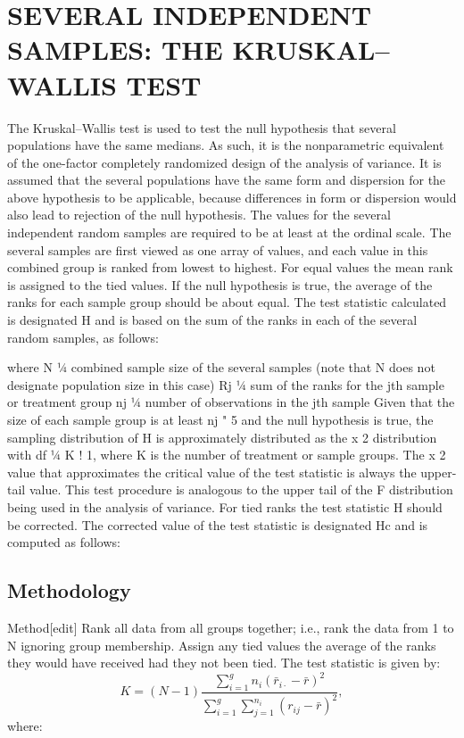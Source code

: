 
\section{SEVERAL INDEPENDENT SAMPLES: THE KRUSKAL–WALLIS TEST}

The Kruskal–Wallis test is used to test the null hypothesis that several populations have the same
medians. As such, it is the nonparametric equivalent of the one-factor completely randomized design of the
analysis of variance. It is assumed that the several populations have the same form and dispersion for the
above hypothesis to be applicable, because differences in form or dispersion would also lead to rejection of
the null hypothesis. The values for the several independent random samples are required to be at least at the
ordinal scale.
The several samples are first viewed as one array of values, and each value in this combined group is
ranked from lowest to highest. For equal values the mean rank is assigned to the tied values. If the null
hypothesis is true, the average of the ranks for each sample group should be about equal. The test statistic
calculated is designated H and is based on the sum of the ranks in each of the several random samples, as
follows:

where N ¼ combined sample size of the several samples
(note that N does not designate population size in this case)
Rj ¼ sum of the ranks for the jth sample or treatment group
nj ¼ number of observations in the jth sample
Given that the size of each sample group is at least nj " 5 and the null hypothesis is true, the sampling
distribution of H is approximately distributed as the x
2 distribution with df ¼ K ! 1, where K is the number
of treatment or sample groups. The x
2 value that approximates the critical value of the test statistic is
always the upper-tail value. This test procedure is analogous to the upper tail of the F distribution being
used in the analysis of variance.
For tied ranks the test statistic H should be corrected. The corrected value of the test statistic is designated
Hc and is computed as follows:

\subsection*{Methodology}
Method[edit]
Rank all data from all groups together; i.e., rank the data from 1 to N ignoring group membership. Assign any tied values the average of the ranks they would have received had they not been tied.
The test statistic is given by:
\[K = (N-1)\frac{\sum_{i=1}^g n_i(\bar{r}_{i\cdot} - \bar{r})^2}{\sum_{i=1}^g\sum_{j=1}^{n_i}(r_{ij} - \bar{r})^2},\] where:

